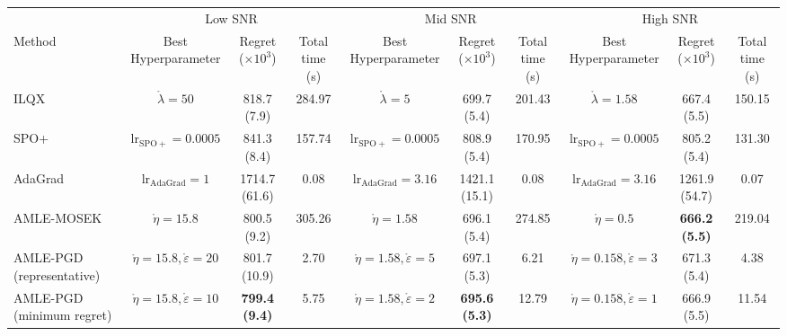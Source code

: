 \begin{tabular}{lccccccccc}
\toprule
 & \multicolumn{3}{c}{Low SNR} & \multicolumn{3}{c}{Mid SNR} & \multicolumn{3}{c}{High SNR} \\
\cmidrule(lr){2-4} \cmidrule(lr){5-7} \cmidrule(lr){8-10}
Method & Best Hyperparameter & Regret ($\times 10^3$) & Total time (s) & Best Hyperparameter & Regret ($\times 10^3$) & Total time (s) & Best Hyperparameter & Regret ($\times 10^3$) & Total time (s) \\
\midrule
ILQX & $\mathring{\lambda} = 50$ & 818.7 (7.9) & 284.97 & $\mathring{\lambda} = 5$ & 699.7 (5.4) & 201.43 & $\mathring{\lambda} = 1.58$ & 667.4 (5.5) & 150.15 \\
SPO+ & $\mathrm{lr}_{\mathrm{SPO+}} = 0.0005$ & 841.3 (8.4) & 157.74 & $\mathrm{lr}_{\mathrm{SPO+}} = 0.0005$ & 808.9 (5.4) & 170.95 & $\mathrm{lr}_{\mathrm{SPO+}} = 0.0005$ & 805.2 (5.4) & 131.30 \\
AdaGrad & $\mathrm{lr}_{\mathrm{AdaGrad}} = 1$ & 1714.7 (61.6) & 0.08 & $\mathrm{lr}_{\mathrm{AdaGrad}} = 3.16$ & 1421.1 (15.1) & 0.08 & $\mathrm{lr}_{\mathrm{AdaGrad}} = 3.16$ & 1261.9 (54.7) & 0.07 \\
AMLE-MOSEK & $\mathring{\eta} = 15.8$ & 800.5 (9.2) & 305.26 & $\mathring{\eta} = 1.58$ & 696.1 (5.4) & 274.85 & $\mathring{\eta} = 0.5$ & \textbf{666.2 (5.5)} & 219.04 \\
AMLE-PGD (representative) & $\mathring{\eta} = 15.8, \mathring{\varepsilon} = 20$ & 801.7 (10.9) & 2.70 & $\mathring{\eta} = 1.58, \mathring{\varepsilon} = 5$ & 697.1 (5.3) & 6.21 & $\mathring{\eta} = 0.158, \mathring{\varepsilon} = 3$ & 671.3 (5.4) & 4.38 \\
AMLE-PGD (minimum regret) & $\mathring{\eta} = 15.8, \mathring{\varepsilon} = 10$ & \textbf{799.4 (9.4)} & 5.75 & $\mathring{\eta} = 1.58, \mathring{\varepsilon} = 2$ & \textbf{695.6 (5.3)} & 12.79 & $\mathring{\eta} = 0.158, \mathring{\varepsilon} = 1$ & 666.9 (5.5) & 11.54 \\
\bottomrule
\end{tabular}
